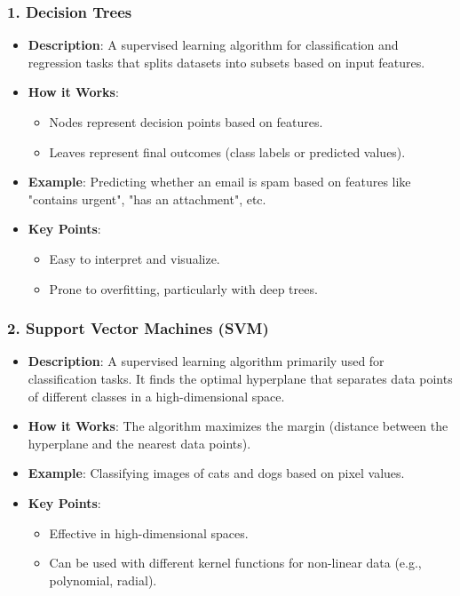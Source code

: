 \documentclass[aspectratio=169]{beamer}
\begin{document}
\begin{frame}[fragile]
    \frametitle{1. Decision Trees}
    \begin{itemize}
        \item \textbf{Description}: A supervised learning algorithm for classification and regression tasks that splits datasets into subsets based on input features.
        \item \textbf{How it Works}: 
            \begin{itemize}
                \item Nodes represent decision points based on features.
                \item Leaves represent final outcomes (class labels or predicted values).
            \end{itemize}
        \item \textbf{Example}: Predicting whether an email is spam based on features like "contains urgent", "has an attachment", etc.
        \item \textbf{Key Points}:
            \begin{itemize}
                \item Easy to interpret and visualize.
                \item Prone to overfitting, particularly with deep trees.
            \end{itemize}
    \end{itemize}
\end{frame}

\begin{frame}[fragile]
    \frametitle{2. Support Vector Machines (SVM)}
    \begin{itemize}
        \item \textbf{Description}: A supervised learning algorithm primarily used for classification tasks. It finds the optimal hyperplane that separates data points of different classes in a high-dimensional space.
        \item \textbf{How it Works}: The algorithm maximizes the margin (distance between the hyperplane and the nearest data points).
        \item \textbf{Example}: Classifying images of cats and dogs based on pixel values.
        \item \textbf{Key Points}:
            \begin{itemize}
                \item Effective in high-dimensional spaces.
                \item Can be used with different kernel functions for non-linear data (e.g., polynomial, radial).
            \end{itemize}
    \end{itemize}
\end{frame}
\end{document}
